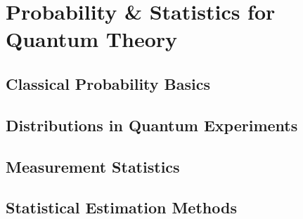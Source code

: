 \chapter{Probability \& Statistics for Quantum Theory}

\section{Classical Probability Basics}

\section{Distributions in Quantum Experiments}

\section{Measurement Statistics}

\section{Statistical Estimation Methods}





